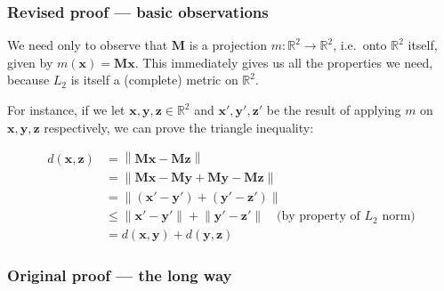 \documentclass{article}
\newcommand{\vect}[1]{\ensuremath{\boldsymbol{\mathbf{#1}}}\xspace}
\begin{document}
\subsubsection{Revised proof --- basic observations}

We need only to observe that $\vect{M}$ is a projection $m : \mathbb{R}^2 \rightarrow \mathbb{R}^2$, i.e.\ onto $\mathbb{R}^2$ itself, given by $m(\vect{x}) = \vect{M}\vect{x}$. This immediately gives us all the properties we need, because $L_2$ is itself a (complete) metric on $\mathbb{R}^2$.

For instance, if we let $\vect{x},\vect{y},\vect{z} \in \mathbb{R}^2$ and $\vect{x'},\vect{y'},\vect{z'}$ be the result of applying $m$ on $\vect{x},\vect{y},\vect{z}$ respectively, we can prove the triangle inequality:

\begin{align}
\nonumber d(\vect{x},\vect{z}) &= \left\|\vect{M}\vect{x} - \vect{M}\vect{z}\right\|\\
\nonumber &= \left\|\vect{M}\vect{x} - \vect{M}\vect{y} + \vect{M}\vect{y} - \vect{M}\vect{z}\right\|\\
\nonumber &= \left\|(\vect{x'} - \vect{y'}) + (\vect{y'} - \vect{z'})\right\|\\
\nonumber &\leq \left\|\vect{x'} - \vect{y'}\right\| + \left\|\vect{y'} - \vect{z'}\right\|\quad \text{(by property of } L_2 \text{ norm)}\\
  &= d(\vect{x},\vect{y}) + d(\vect{y},\vect{z})
\end{align}

\subsubsection{Original proof --- the long way}
\end{document}
